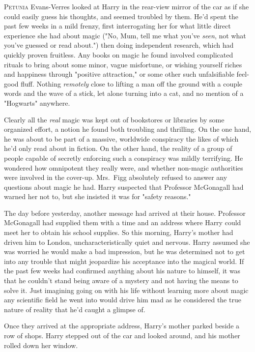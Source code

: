 
\lettrine{P}{etunia} Evans-Verres looked at Harry in the rear-view
mirror of the car as if she could easily guess his thoughts,
and seemed troubled by them. He'd spent the past few
weeks in a mild frenzy, first interrogating her for what little
direct experience she had about magic ("No, Mum, tell me
what you've \emph{seen}, not what you've guessed or read
about.") then doing independent research, which had
quickly proven fruitless. Any books on magic he found
involved complicated rituals to bring about some minor,
vague misfortune, or wishing yourself riches and happiness
through "positive attraction," or some other such
unfalsifiable feel-good fluff. Nothing \emph{remotely} close to lifting
a man off the ground with a couple words and the wave
of a stick, let alone turning into a cat, and no mention of
a "Hogwarts" anywhere.

Clearly all the \emph{real} magic was kept out of bookstores or
libraries by some organized effort, a notion he found both
troubling and thrilling. On the one hand, he was about to
be part of a massive, worldwide conspiracy the likes of
which he'd only read about in fiction. On the other hand,
the reality of a group of people capable of secretly
enforcing such a conspiracy was mildly terrifying. He
wondered how omnipotent they really were, and whether
non-magic authorities were involved in the cover-up.
Mrs.~Figg absolutely refused to answer any questions about magic
he had. Harry suspected that Professor McGonagall had warned her not to,
but she insisted it was for "safety reasons."

The day before yesterday, another message had
arrived at their house. Professor McGonagall had supplied
them with a time and an address where Harry could meet
her to obtain his school supplies. So this morning, Harry's
mother had driven him to London, uncharacteristically quiet
and nervous. Harry assumed she was worried he would
make a bad impression, but he was determined not to get
into any trouble that might jeopardize his acceptance into
the magical world. If the past few weeks had confirmed
anything about his nature to himself, it was that he
couldn't stand being aware of a mystery and not having
the means to solve it. Just imagining going on with his life
without learning more about magic{\el} any scientific field he
went into would drive him mad as he considered the true
nature of reality that he'd caught a glimpse of.

Once they arrived at the appropriate address, Harry's
mother parked beside a row of shops. Harry stepped out
of the car and looked around, and his mother rolled down
her window.

